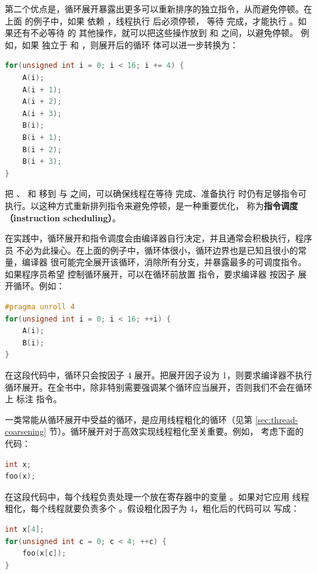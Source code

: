 第二个优点是，循环展开暴露出更多可以重新排序的独立指令，从而避免停顿。在上面
的例子中，如果  依赖 ，线程执行  后必须停顿，
等待  完成，才能执行 。如果还有不必等待  的
其他操作，就可以把这些操作放到  和  之间，以避免停顿。
例如，如果  独立于  和 ，则展开后的循环
体可以进一步转换为：

\begin{lstlisting}[language=C++]
for(unsigned int i = 0; i < 16; i += 4) {
    A(i);
    A(i + 1);
    A(i + 2);
    A(i + 3);
    B(i);
    B(i + 1);
    B(i + 2);
    B(i + 3);
}
\end{lstlisting}

把 、 和  移到  与
 之间，可以确保线程在等待  完成、准备执行 
时仍有足够指令可执行。以这种方式重新排列指令来避免停顿，是一种重要优化，
称为\textbf{指令调度（instruction scheduling）}。

在实践中，循环展开和指令调度会由编译器自行决定，并且通常会积极执行，程序员
不必为此操心。在上面的例子中，循环体很小，循环边界也是已知且很小的常量，编译器
很可能完全展开该循环，消除所有分支，并暴露最多的可调度指令。如果程序员希望
控制循环展开，可以在循环前放置  指令，要求编译器
按因子  展开循环。例如：

\begin{lstlisting}[language=C++]
#pragma unroll 4
for(unsigned int i = 0; i < 16; ++i) {
    A(i);
    B(i);
}
\end{lstlisting}

在这段代码中，循环只会按因子 4 展开。把展开因子设为 1，则要求编译器不执行
循环展开。在全书中，除非特别需要强调某个循环应当展开，否则我们不会在循环上
标注  指令。

一类常能从循环展开中受益的循环，是应用线程粗化的循环（见第
\ref{sec:thread-coarsening} 节）。循环展开对于高效实现线程粗化至关重要。例如，
考虑下面的代码：

\begin{lstlisting}[language=C++]
int x;
foo(x);
\end{lstlisting}

在这段代码中，每个线程负责处理一个放在寄存器中的变量 。如果对它应用
线程粗化，每个线程就要负责多个 。假设粗化因子为 4，粗化后的代码可以
写成：

\begin{lstlisting}[language=C++]
int x[4];
for(unsigned int c = 0; c < 4; ++c) {
    foo(x[c]);
}
\end{lstlisting}


